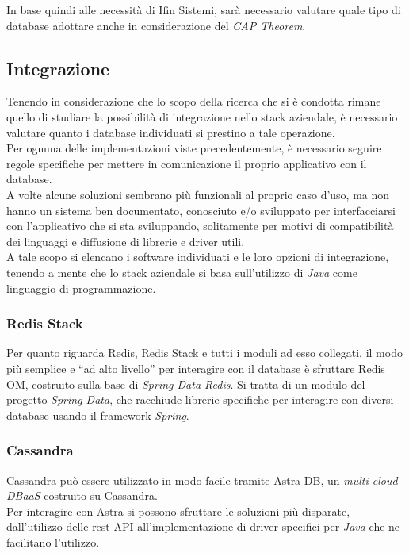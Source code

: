 \noindent In base quindi alle necessità di Ifin Sistemi, sarà necessario valutare quale tipo di database adottare anche in considerazione del \textit{CAP Theorem}.

\subsection{Integrazione}
Tenendo in considerazione che lo scopo della ricerca che si è condotta rimane quello di studiare la possibilità di integrazione nello stack aziendale, è necessario valutare quanto i database individuati si prestino a tale operazione.\\

\noindent Per ognuna delle implementazioni viste precedentemente, è necessario seguire regole specifiche per mettere in comunicazione il proprio applicativo con il database.\\
A volte alcune soluzioni sembrano più funzionali al proprio caso d'uso, ma non hanno un sistema ben documentato, conosciuto e/o sviluppato per interfacciarsi con l'applicativo che si sta sviluppando, solitamente per motivi di compatibilità dei linguaggi e diffusione di librerie e driver utili.\\
A tale scopo si elencano i software individuati e le loro opzioni di integrazione, tenendo a mente che lo stack aziendale si basa sull'utilizzo di \textit{Java} come linguaggio di programmazione.

\subsubsection{Redis Stack}
Per quanto riguarda Redis, Redis Stack e tutti i moduli ad esso collegati, il modo più semplice e ``ad alto livello'' per interagire con il database è sfruttare Redis OM, costruito sulla base di \textit{Spring Data Redis}. Si tratta di un modulo del progetto \textit{Spring Data}, che racchiude librerie specifiche per interagire con diversi database usando il framework \textit{Spring}\cite{site:udemyredis}.

\subsubsection{Cassandra}
Cassandra può essere utilizzato in modo facile tramite Astra DB, un \textit{multi-cloud \gls{DBaaS}} costruito su Cassandra.\\
Per interagire con Astra si possono sfruttare le soluzioni più disparate, dall'utilizzo delle \gls{rest API} all'implementazione di driver specifici per \textit{Java} che ne facilitano l'utilizzo\cite{site:udemycassandra}.

